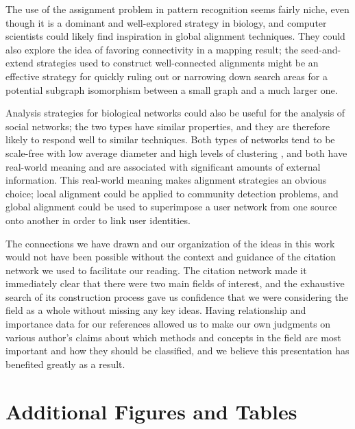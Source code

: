 \documentclass[12pt]{thesis}
\theoremstyle{plain}
\theoremstyle{definition}
\theoremstyle{remark}
\begin{document}
The use of the assignment problem in pattern recognition seems fairly niche, even though it is a dominant and well-explored strategy in biology, and computer scientists could likely find inspiration in global alignment techniques. They could also explore the idea of favoring connectivity in a mapping result; the seed-and-extend strategies used to construct well-connected alignments might be an effective strategy for quickly ruling out or narrowing down search areas for a potential subgraph isomorphism between a small graph and a much larger one.

Analysis strategies for biological networks could also be useful for the analysis of social networks; the two types have similar properties, and they are therefore likely to respond well to similar techniques. Both types of networks tend to be scale-free with low average diameter and high levels of clustering \cite{jackson2005economics}, and both have real-world meaning and are associated with significant amounts of external information. This real-world meaning makes alignment strategies an obvious choice; local alignment could be applied to community detection problems, and global alignment could be used to superimpose a user network from one source onto another in order to link user identities. 

The connections we have drawn and our organization of the ideas in this work would not have been possible without the context and guidance of the citation network we used to facilitate our reading. The citation network made it immediately clear that there were two main fields of interest, and the exhaustive search of its construction process gave us confidence that we were considering the field as a whole without missing any key ideas. Having relationship and importance data for our references allowed us to make our own judgments on various author's claims about which methods and concepts in the field are most important and how they should be classified, and we believe this presentation has benefited greatly as a result.





\newpage
\appendix
\chapter{Additional Figures and Tables}\label{chapter:appendices}
\end{document}
